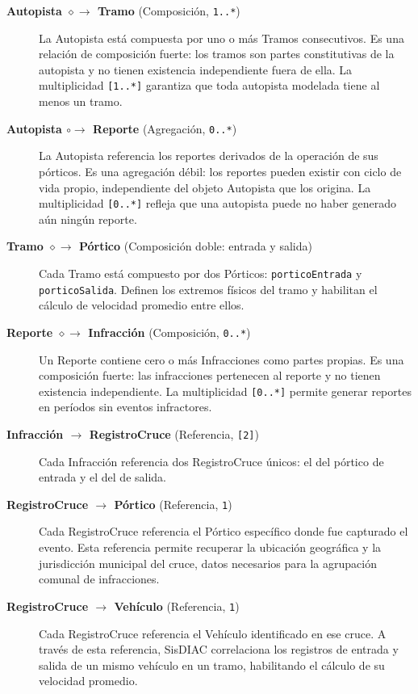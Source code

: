 \documentclass[12pt,letterpaper]{article}
\begin{document}
{\sloppy
	\begin{description}

		\item[\textbf{Autopista $\boldsymbol{\diamond\!\!\to}$ Tramo} (Composición, \texttt{1..*})]
		      La Autopista está compuesta por uno o más Tramos consecutivos. Es una relación de composición fuerte: los tramos son partes constitutivas de la autopista y no tienen existencia independiente fuera de ella. La multiplicidad \texttt{[1..*]} garantiza que toda autopista modelada tiene al menos un tramo.

		\item[\textbf{Autopista $\boldsymbol{\circ\!\!\to}$ Reporte} (Agregación, \texttt{0..*})]
		      La Autopista referencia los reportes derivados de la operación de sus pórticos. Es una agregación débil: los reportes pueden existir con ciclo de vida propio, independiente del objeto Autopista que los origina. La multiplicidad \texttt{[0..*]} refleja que una autopista puede no haber generado aún ningún reporte.

		\item[\textbf{Tramo $\boldsymbol{\diamond\!\!\to}$ Pórtico} (Composición doble: entrada y salida)]
		      Cada Tramo está compuesto por dos Pórticos: \texttt{porticoEntrada} y \texttt{porticoSalida}. Definen los extremos físicos del tramo y habilitan el cálculo de velocidad promedio entre ellos.

		\item[\textbf{Reporte $\boldsymbol{\diamond\!\!\to}$ Infracción} (Composición, \texttt{0..*})]
		      Un Reporte contiene cero o más Infracciones como partes propias. Es una composición fuerte: las infracciones pertenecen al reporte y no tienen existencia independiente. La multiplicidad \texttt{[0..*]} permite generar reportes en períodos sin eventos infractores.

		\item[\textbf{Infracción $\boldsymbol{\to}$ RegistroCruce} (Referencia, \texttt{[2]})]
		      Cada Infracción referencia dos RegistroCruce únicos: el del pórtico de entrada y el del de salida.

		\item[\textbf{RegistroCruce $\boldsymbol{\to}$ Pórtico} (Referencia, \texttt{1})]
		      Cada RegistroCruce referencia el Pórtico específico donde fue capturado el evento. Esta referencia permite recuperar la ubicación geográfica y la jurisdicción municipal del cruce, datos necesarios para la agrupación comunal de infracciones.

		\item[\textbf{RegistroCruce $\boldsymbol{\to}$ Vehículo} (Referencia, \texttt{1})]
		      Cada RegistroCruce referencia el Vehículo identificado en ese cruce. A través de esta referencia, SisDIAC correlaciona los registros de entrada y salida de un mismo vehículo en un tramo, habilitando el cálculo de su velocidad promedio.

	\end{description}
}
\end{document}
